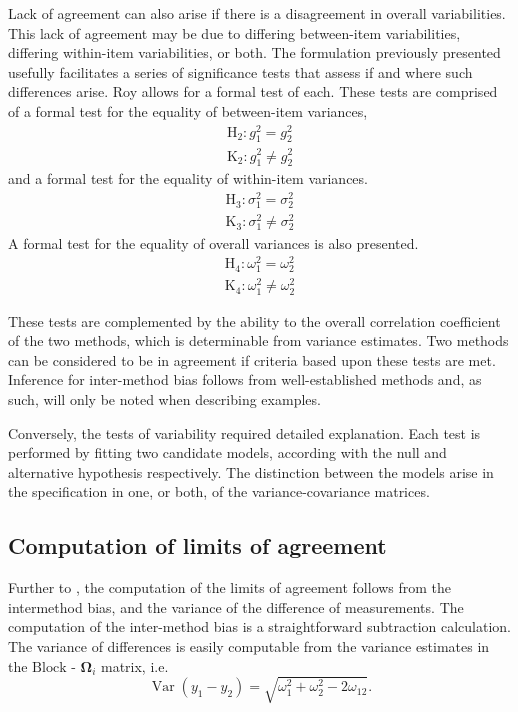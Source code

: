 \documentclass[Chap4main.tex]{subfiles}
\begin{document}
Lack of agreement can also arise if there is a disagreement in overall variabilities. This lack of agreement may be due to differing between-item variabilities, differing within-item variabilities, or both. The formulation previously presented usefully facilitates a series of significance tests that assess if and where such differences arise. Roy allows for a formal test of each. These tests are comprised of a formal test for the equality of between-item variances,
\begin{eqnarray*}
\operatorname{H_2} : g^2_1 = g^2_2 \\
\operatorname{K_2} : g^2_1 \neq g^2_2
\end{eqnarray*}
and a formal test for the equality of within-item variances.
\begin{eqnarray*}
\operatorname{H_3} : \sigma^2_1 = \sigma^2_2 \\
\operatorname{K_3} : \sigma^2_1 \neq \sigma^2_2
\end{eqnarray*}
A formal test for the equality of overall variances is also presented.
\begin{eqnarray*}
\operatorname{H_4} : \omega^2_1 = \omega^2_2 \\
\operatorname{K_4} : \omega^2_1 \neq \omega^2_2
\end{eqnarray*}

These tests are complemented by the ability to the overall correlation coefficient of the two methods, which is determinable from variance estimates. Two methods can be considered to be in agreement if criteria based upon these tests are met. Inference for inter-method bias follows from well-established methods and, as such, will only be noted when describing examples.

Conversely, the tests of variability required detailed explanation. Each test is performed by fitting two candidate models, according with the null and alternative hypothesis respectively. The distinction between the models arise in the specification in one, or both, of the variance-covariance matrices. %



\subsection{Computation of limits of agreement }


Further to \citet{BA86}, the computation of the limits of agreement follows from the intermethod bias, and the variance of the difference of measurements. The computation of the inter-method bias is a straightforward subtraction calculation. The variance of differences is easily computable from the variance estimates in the ${\mbox{Block - }\boldsymbol \Omega_{i}}$ matrix, i.e.
\[
\operatorname{Var}(y_1 - y_2) = \sqrt{ \omega^2_1 + \omega^2_2 - 2\omega_{12}}.
\]
\end{document}
